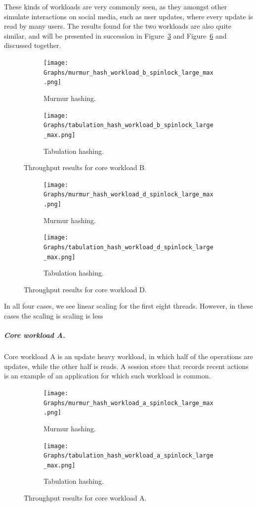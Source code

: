 \documentclass[11pt]{article} %
\begin{document}
These kinds of workloads are very commonly seen, as they amongst other simulate interactions on social media, such as user updates, where every update is read by many users. The results found for the two workloads are also quite similar, and will be presented in succession in Figure~\ref{fig:res_b} and Figure~\ref{fig:res_d} and discussed together.\\
\begin{figure}[ht]
  \centering
  \begin{subfigure}[b]{0.45\textwidth}
    \texttt{[image: Graphs/murmur\_hash\_workload\_b\_spinlock\_large\_max.png]}
    \caption[]{Murmur hashing.}
    \label{fig:mur_b}
  \end{subfigure} \hfill
  \begin{subfigure}[b]{0.45\textwidth}
    \texttt{[image: Graphs/tabulation\_hash\_workload\_b\_spinlock\_large\_max.png]}
    \caption[]{Tabulation hashing.}
    \label{fig:tab_b}
  \end{subfigure}
  \caption[]{Throughput results for core workload B.}
  \label{fig:res_b}
\end{figure}
\begin{figure}[ht]
  \centering
  \begin{subfigure}[b]{0.45\textwidth}
    \texttt{[image: Graphs/murmur\_hash\_workload\_d\_spinlock\_large\_max.png]}
    \caption[]{Murmur hashing.}
    \label{fig:mur_d}
  \end{subfigure} \hfill
  \begin{subfigure}[b]{0.45\textwidth}
    \texttt{[image: Graphs/tabulation\_hash\_workload\_d\_spinlock\_large\_max.png]}
    \caption[]{Tabulation hashing.}
    \label{fig:tab_d}
  \end{subfigure}
  \caption[]{Throughput results for core workload D.}
  \label{fig:res_d}
\end{figure}

In all four cases, we see linear scaling for the first eight threads. However, in these cases the scaling is scaling is less 

\subparagraph{Core workload A.} Core workload A is an update heavy workload, in which half of the operations are updates, while the other half is reads. A session store that records recent actions is an example of an application for which such workload is common. 
\begin{figure}[ht]
  \centering
  \begin{subfigure}[b]{0.45\textwidth}
    \texttt{[image: Graphs/murmur\_hash\_workload\_a\_spinlock\_large\_max.png]}
    \caption[]{Murmur hashing.}
    \label{fig:mur_a}
  \end{subfigure} \hfill
  \begin{subfigure}[b]{0.45\textwidth}
    \texttt{[image: Graphs/tabulation\_hash\_workload\_a\_spinlock\_large\_max.png]}
    \caption[]{Tabulation hashing.}
    \label{fig:tab_a}
  \end{subfigure}
  \caption[]{Throughput results for core workload A.}
  \label{fig:res_a}
\end{figure}
\end{document}
